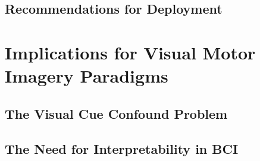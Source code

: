 \subsection{Recommendations for Deployment}
\label{subsec:discuss_recommendations}

%
%
%
%
%


\section{Implications for Visual Motor Imagery Paradigms}
\label{sec:discuss_implications_broad}



\subsection{The Visual Cue Confound Problem}
\label{subsec:discuss_visual_confound}

%
%
%
%


\subsection{The Need for Interpretability in BCI}
\label{subsec:discuss_need_interpretability}

